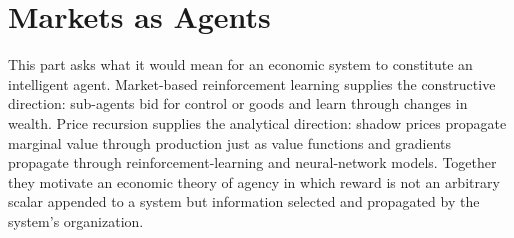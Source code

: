 \chapter{Markets as Agents}
\label{chap:agency-intro}

\begin{drafttext}
This part asks what it would mean for an economic system to constitute an
intelligent agent. Market-based reinforcement learning supplies the constructive
direction: sub-agents bid for control or goods and learn through changes in
wealth. Price recursion supplies the analytical direction: shadow prices
propagate marginal value through production just as value functions and
gradients propagate through reinforcement-learning and neural-network models.
Together they motivate an economic theory of agency in which reward is not an
arbitrary scalar appended to a system but information selected and propagated
by the system's organization.
\end{drafttext}
